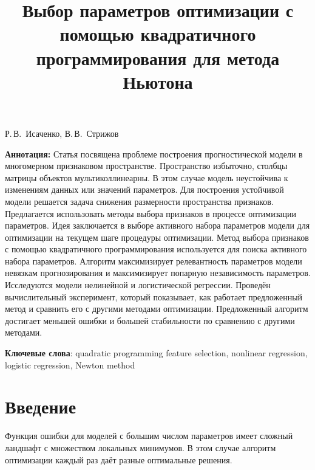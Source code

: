 \documentclass[a4paper,12pt]{article}
\theoremstyle{plain} %
\theoremstyle{definition} %
\theoremstyle{remark} %
\begin{document}
		
		\title
	{Выбор параметров оптимизации с помощью квадратичного программирования для метода Ньютона}
	\date{}
	\maketitle
	\begin{center}
		Р.\,В.~Исаченко,
		В.\,В.~Стрижов
	\end{center}
	\textbf{Аннотация:} 
	Статья посвящена проблеме построения прогностической модели в многомерном признаковом пространстве.
	Пространство избыточно, столбцы матрицы объектов мультиколлинеарны.
	В этом случае модель неустойчива к изменениям данных или значений параметров. 
	Для построения устойчивой модели решается задача снижения размерности пространства признаков.
	Предлагается использовать методы выбора признаков в процессе оптимизации параметров.
	Идея заключается в выборе активного набора параметров модели для оптимизации на текущем шаге процедуры оптимизации.
	Метод выбора признаков с помощью квадратичного программирования используется для поиска активного набора параметров. 
	Алгоритм максимизирует релевантность параметров модели невязкам прогнозирования и максимизирует попарную независимость параметров. 
	Исследуются модели нелинейной и логистической регрессии. 
	Проведён вычислительный эксперимент, который показывает, как работает предложенный метод и сравнить его с другими методами оптимизации. 
	Предложенный алгоритм достигает меньшей ошибки и большей стабильности по сравнению с другими методами.
	
	\bigskip
	\textbf{Ключевые слова}: quadratic programming feature selection, nonlinear regression, logistic regression, Newton method
	
	\section*{Введение}
	Функция ошибки для моделей с большим числом параметров имеет сложный ландшафт с множеством локальных минимумов. 
	В этом случае алгоритм оптимизации каждый раз даёт разные оптимальные решения.
	
\end{document}
